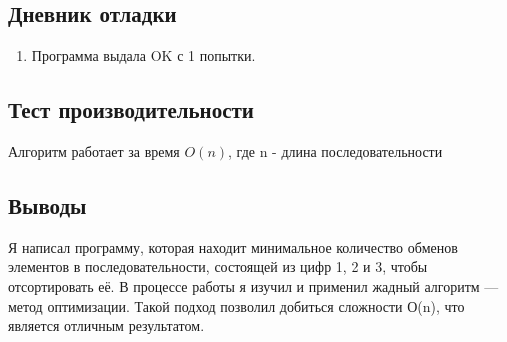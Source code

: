 \documentclass[12pt]{article}
\begin{document}
\newpage
\subsection*{Дневник отладки}

\begin{enumerate}
    \item Программа выдала {OK} с 1 попытки.
\end{enumerate}

\newpage
\subsection*{Тест производительности}

Алгоритм работает за время $O(n)$, где n - длина последовательности



\newpage
\subsection*{Выводы}


Я написал программу, которая находит минимальное количество обменов элементов в последовательности, состоящей из цифр 1, 2 и 3, чтобы отсортировать её. В процессе работы я изучил и применил жадный алгоритм — метод оптимизации. Такой подход позволил добиться сложности О(n), что является отличным результатом.
\end{document}
